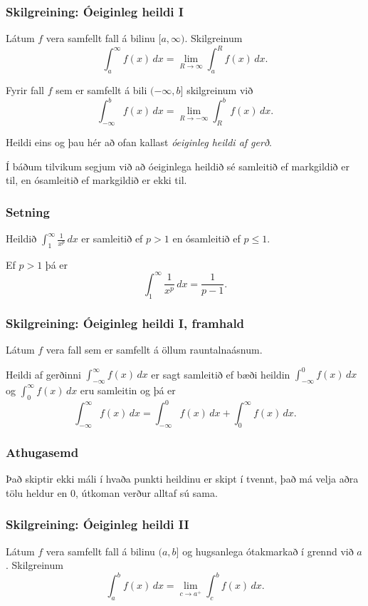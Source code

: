 \documentclass[icelandic,a4paper,12pt]{article}
\begin{document}
\subsubsection{Skilgreining: Óeiginleg heildi I}
Látum $f$ vera samfellt fall á bilinu $[a, \infty)$. 
Skilgreinum 
$$\int_a^\infty f(x)\,dx=\lim_{R\rightarrow\infty} \int_a^R f(x)\,dx.$$

Fyrir fall $f$ sem er samfellt á bili $(-\infty, b]$ skilgreinum við
$$\int_{-\infty}^b f(x)\,dx=\lim_{R\rightarrow-\infty} \int_R^b f(x)\,dx.$$

Heildi eins og þau hér að ofan kallast \emph{óeiginleg heildi af gerð}.

Í báðum tilvikum segjum við að óeiginlega heildið sé samleitið ef
markgildið er til, en ósamleitið ef markgildið er ekki til.

\subsubsection{Setning} 
Heildið $\int_1^\infty \frac{1}{x^p}\,dx$ er samleitið ef $p>1$ 
en ósamleitið ef $p\leq 1$. 

Ef $p>1$ þá er 
$$
\int_1^\infty \frac{1}{x^p}\,dx=\frac{1}{p-1}.
$$

\subsubsection{Skilgreining: Óeiginleg heildi I, framhald}
Látum $f$ vera fall sem er samfellt á öllum rauntalnaásnum. 

Heildi af gerðinni $\int_{-\infty}^\infty f(x)\,dx$ er sagt samleitið ef 
bæði heildin  $\int_{-\infty}^0 f(x)\,dx$ og 
$\int_0^\infty f(x)\,dx$ eru samleitin og þá er 
$$
  \int_{-\infty}^\infty f(x)\,dx=\int_{-\infty}^0 f(x)\,dx +
  \int_0^\infty f(x)\,dx.
$$

\subsubsection{Athugasemd}
Það skiptir ekki máli í hvaða punkti heildinu er skipt í tvennt, það má
velja aðra tölu heldur en 0, útkoman verður alltaf sú sama.

\subsubsection{Skilgreining: Óeiginleg heildi II} 
Látum $f$ vera samfellt fall á bilinu $(a, b]$ og hugsanlega
ótakmarkað í grennd við $a$. Skilgreinum 
$$\int_a^b f(x)\,dx=\lim_{c\rightarrow a^+} \int_c^b f(x)\,dx.$$
\end{document}
